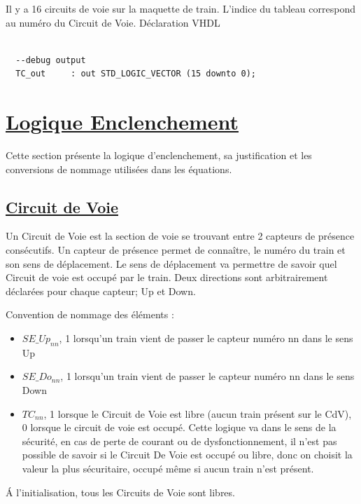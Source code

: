 Il y a 16 circuits de voie sur la maquette de train. L'indice du
tableau correspond au numéro du Circuit de Voie.
\medskip
\medskip
Déclaration VHDL
\begin{lstlisting}[style=vhdl]

  --debug output
  TC_out     : out STD_LOGIC_VECTOR (15 downto 0);

\end{lstlisting}

\newpage

\section{\underline{Logique Enclenchement}}
\label{sec:log_enc}

Cette section présente la logique d'enclenchement, sa justification et
les conversions de nommage utilisées dans les équations.

\subsection{\underline{Circuit de Voie}}
\label{sec:CdV}

Un Circuit de Voie est la section de voie se trouvant entre 2 capteurs
de présence consécutifs. Un capteur de présence permet de
connaître, le numéro du train et son sens de déplacement. Le sens de
déplacement va permettre de savoir quel Circuit de voie est occupé par le
train. Deux directions sont arbitrairement déclarées pour chaque
capteur; Up et Down.

Convention de nommage des éléments :
\begin{itemize}
\item $SE\_Up_{nn}$, 1 lorsqu'un train vient de passer le capteur numéro
  nn dans le sens Up
\item $SE\_Do_{nn}$, 1 lorsqu'un train vient de passer le capteur numéro
  nn dans le sens Down
\item $TC_{nn}$, 1 lorsque le Circuit de Voie est libre (aucun train
  présent sur le CdV), 0 lorsque le circuit de voie est occupé. Cette
  logique va dans le sens de la sécurité, en cas de perte de courant
  ou de dysfonctionnement, il n'est pas possible de savoir si le
  Circuit De Voie est occupé ou libre, donc on choisit la valeur la
  plus sécuritaire, occupé même si aucun train n'est présent.
\end{itemize}

\'A l'initialisation, tous les Circuits de Voie sont libres.

